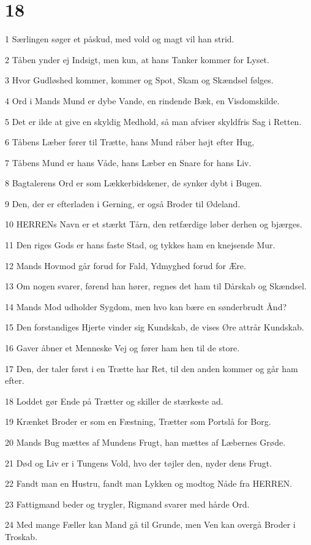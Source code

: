 \chapter{18}

\par 1 Særlingen søger et påskud, med vold og magt vil han strid.
\par 2 Tåben ynder ej Indsigt, men kun, at hans Tanker kommer for Lyset.
\par 3 Hvor Gudløshed kommer, kommer og Spot, Skam og Skændsel følges.
\par 4 Ord i Mands Mund er dybe Vande, en rindende Bæk, en Visdomskilde.
\par 5 Det er ilde at give en skyldig Medhold, så man afviser skyldfris Sag i Retten.
\par 6 Tåbens Læber fører til Trætte, hans Mund råber højt efter Hug,
\par 7 Tåbens Mund er hans Våde, hans Læber en Snare for hans Liv.
\par 8 Bagtalerens Ord er som Lækkerbidskener, de synker dybt i Bugen.
\par 9 Den, der er efterladen i Gerning, er også Broder til Ødeland.
\par 10 HERRENs Navn er et stærkt Tårn, den retfærdige løber derhen og bjærges.
\par 11 Den riges Gods er hans faste Stad, og tykkes ham en knejsende Mur.
\par 12 Mands Hovmod går forud for Fald, Ydmyghed forud for Ære.
\par 13 Om nogen svarer, førend han hører, regnes det ham til Dårskab og Skændsel.
\par 14 Mands Mod udholder Sygdom, men hvo kan bære en sønderbrudt Ånd?
\par 15 Den forstandiges Hjerte vinder sig Kundskab, de vises Øre attrår Kundskab.
\par 16 Gaver åbner et Menneske Vej og fører ham hen til de store.
\par 17 Den, der taler først i en Trætte har Ret, til den anden kommer og går ham efter.
\par 18 Loddet gør Ende på Trætter og skiller de stærkeste ad.
\par 19 Krænket Broder er som en Fæstning, Trætter som Portslå for Borg.
\par 20 Mands Bug mættes af Mundens Frugt, han mættes af Læbernes Grøde.
\par 21 Død og Liv er i Tungens Vold, hvo der tøjler den, nyder dens Frugt.
\par 22 Fandt man en Hustru, fandt man Lykken og modtog Nåde fra HERREN.
\par 23 Fattigmand beder og trygler, Rigmand svarer med hårde Ord.
\par 24 Med mange Fæller kan Mand gå til Grunde, men Ven kan overgå Broder i Troskab.

